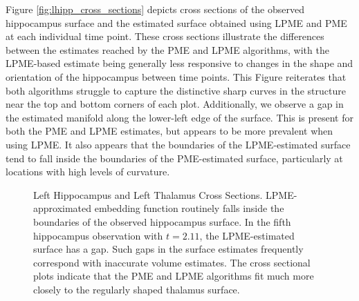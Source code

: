 \documentclass[12pt]{article}
\theoremstyle{definition}
\begin{document}
Figure \ref{fig:lhipp_cross_sections} depicts cross sections of the observed hippocampus surface and the estimated surface obtained using LPME and PME at each individual time point. These cross sections illustrate the differences between the estimates reached by the PME and LPME algorithms, with the LPME-based estimate being generally less responsive to changes in the shape and orientation of the hippocampus between time points. This Figure reiterates that both algorithms struggle to capture the distinctive sharp curves in the structure near the top and bottom corners of each plot. Additionally, we observe a gap in the estimated manifold along the lower-left edge of the surface. This is present for both the PME and LPME estimates, but appears to be more prevalent when using LPME. It also appears that the boundaries of the LPME-estimated surface tend to fall inside the boundaries of the PME-estimated surface, particularly at locations with high levels of curvature.

\begin{figure}
  \centering
  \hfill
  
  \caption{{\footnotesize Left Hippocampus and Left Thalamus Cross Sections. LPME-approximated embedding function routinely falls inside the boundaries of the observed hippocampus surface. In the fifth hippocampus observation with $t=2.11$, the LPME-estimated surface has a gap. Such gaps in the surface estimates frequently correspond with inaccurate volume estimates. The cross sectional plots indicate that the PME and LPME algorithms fit much more closely to the regularly shaped thalamus surface.}}
  \label{fig:adni_cross_sections}
\end{figure}
\end{document}

